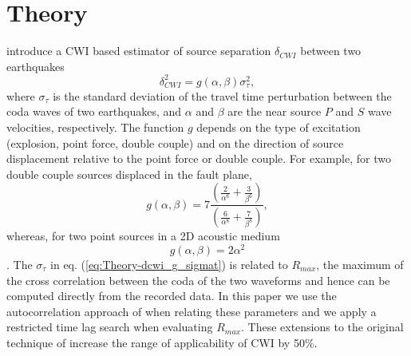 \documentclass[extra]{gji}
\begin{document}
\section{Theory}

\citet{dr_Snieder05a} introduce a CWI based estimator of source
separation $\delta_{CWI}$ between two earthquakes
\begin{equation}
\label{eq:Theory-dcwi_g_sigmat}
\delta_{CWI}^2 = g(\alpha,\beta)\sigma_\tau^2,
\end{equation}
where $\sigma_\tau$ is the standard deviation of the travel time perturbation
between the coda waves of two earthquakes,
and $\alpha$ and $\beta$ are the near source $P$ and $S$ wave velocities,
respectively. The function $g$ depends on the type of excitation
(explosion, point force, double couple) and on the direction of
source displacement relative to the point force or double
couple. For example, for two double couple sources displaced in the
fault plane,
\begin{equation}
\label{eq:LitReview-g-3d-dc}
g(\alpha,\beta) = 7
\frac{\left(\frac{2}{\alpha^6}+\frac{3}{\beta^6}\right)}{\left(\frac{6}{\alpha^8}+\frac{7}{\beta^8}\right)},
\end{equation}
whereas, for two point sources in a 2D acoustic medium
\begin{equation}
\label{eq:LitReview-g-2d-ps} g(\alpha,\beta) = 2 \alpha^2
\end{equation}
\citep{dr_Snieder05a}. The
$\sigma_\tau$ in eq. (\ref{eq:Theory-dcwi_g_sigmat}) is related to $R_{max}$, the maximum of the cross correlation between
the coda of the two waveforms and hence can be computed directly from the recorded data.
In this paper we use the autocorrelation
approach of \citet{dr_Robinson10b} when relating these parameters
and we apply a restricted time lag search when evaluating $R_{max}$. These extensions
to the original technique of \citet{dr_Snieder05a} increase the range of applicability
of CWI by 50\%.
\end{document}
